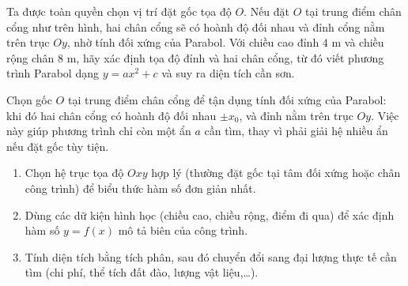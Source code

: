 \begin{center}
\end{center}

\begin{hopgoiy}
Ta được toàn quyền chọn vị trí đặt gốc tọa độ $O$. Nếu đặt $O$ tại trung điểm chân cổng như trên hình, hai chân cổng sẽ có hoành độ đối nhau và đỉnh cổng nằm trên trục $Oy$, nhờ tính đối xứng của Parabol. Với chiều cao đỉnh $4$ m và chiều rộng chân $8$ m, hãy xác định tọa độ đỉnh và hai chân cổng, từ đó viết phương trình Parabol dạng $y=ax^2+c$ và suy ra diện tích cần sơn.
\end{hopgoiy}

\begin{hopyduong}
Chọn gốc $O$ tại trung điểm chân cổng để tận dụng tính đối xứng của Parabol: khi đó hai chân cổng có hoành độ đối nhau $\pm x_0$, và đỉnh nằm trên trục $Oy$. Việc này giúp phương trình chỉ còn một ẩn $a$ cần tìm, thay vì phải giải hệ nhiều ẩn nếu đặt gốc tùy tiện.
\end{hopyduong}

\begin{hopphuongphap}
\begin{enumerate}[leftmargin=1cm]
  \item Chọn hệ trục tọa độ $Oxy$ hợp lý (thường đặt gốc tại tâm đối xứng hoặc chân công trình) để biểu thức hàm số đơn giản nhất.
  \item Dùng các dữ kiện hình học (chiều cao, chiều rộng, điểm đi qua) để xác định hàm số $y=f(x)$ mô tả biên của công trình.
  \item Tính diện tích bằng tích phân, sau đó chuyển đổi sang đại lượng thực tế cần tìm (chi phí, thể tích đất đào, lượng vật liệu,\ldots).
\end{enumerate}
\end{hopphuongphap}

